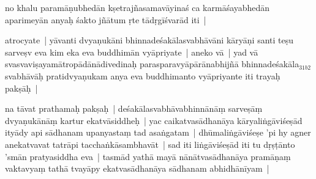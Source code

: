 \documentclass[article,12pt,a4paper]{memoir}%
\newcommand{\gap}[1]{}
\newcounter{parCount}
\begin{document}
	  
	  \pstart \leavevmode%
	\label{thakur75-55.16}no khalu paramāṇubhedān kṣetrajñasamavāyinaś ca karmāśayabhedān aparimeyān anyaḥ śakto jñātum ṛte tādṛgīśvarād\label{ratnakīrtinibandhāvali__36r1NJ1HHMVH5RR7U2GTVWCF63V} iti |
	{}
	\pend%
      

	  
	  \pstart \leavevmode%
	\label{thakur75-55.18}atrocyate | yāvanti dvyaṇukāni bhinnadeśakālasvabhāvāni kāryāṇi santi teṣu sarveṣv eva kim eka eva buddhimān vyāpriyate | aneko vā | yad vā svasvaviṣayamātropādānādivedinaḥ parasparavyāpārānabhijñā bhinnadeśakāla{\tiny $_{31b2}$}svabhāvāḥ pratidvyaṇukam anya eva buddhimanto vyāpriyante iti trayaḥ pakṣāḥ |
	{}
	\pend%
      

	  
	  \pstart \leavevmode%
	\label{thakur75-55.22}na tāvat \label{ratnakīrtinibandhāvali__36r1NM7W6RLH3UQ01ZEG4Q53FWC}prathamaḥ pakṣaḥ |\label{ratnakīrtinibandhāvali__36r1NM7W6SG03AESJNSHQ1FK1L5} de\gap{}śakālasvabhāvabhinnānāṃ sarveṣāṃ dvyaṇukānāṃ kartur ekatvāsiddheḥ | yac caikatvasādhanāya kāryaliṅgāviśeṣād ityādy api sādhanam upanyastaṃ tad asaṅgatam | dhūmaliṅgāviśeṣe 'pi hy agner anekatvavat tatrāpi tacchaṅkāsambhavāt | \label{ratnakīrtinibandhāvali__36r1NSAWNTV0PU093F550ENXSD2}sad iti liṅgāviśeṣād\label{ratnakīrtinibandhāvali__36r1NSAWNTWQ48AKDPN5RIVJIC3} iti tu dṛṣṭānto 'smān pratyasiddha eva | tasmād yathā mayā nānātvasādhanāya pramāṇaṃ vaktavyaṃ tathā tvayāpy ekatvasādhanāya sādhanam abhidhānīyam |
	{}
	\pend%
      
\end{document}
